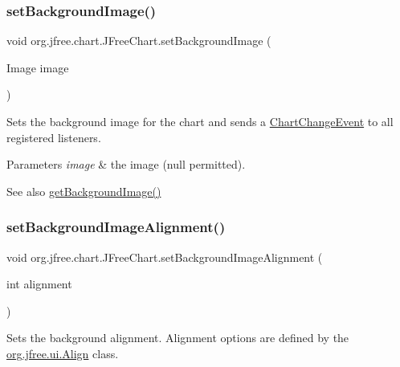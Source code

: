 \subsubsection{\texorpdfstring{set\+Background\+Image()}{setBackgroundImage()}}
{\footnotesize\ttfamily void org.\+jfree.\+chart.\+J\+Free\+Chart.\+set\+Background\+Image (\begin{DoxyParamCaption}\item[{Image}]{image }\end{DoxyParamCaption})}

Sets the background image for the chart and sends a \mbox{\hyperlink{}{Chart\+Change\+Event}} to all registered listeners.


\begin{DoxyParams}{Parameters}
{\em image} & the image ({\ttfamily null} permitted).\\
\hline
\end{DoxyParams}
\begin{DoxySeeAlso}{See also}
\mbox{\hyperlink{classorg_1_1jfree_1_1chart_1_1_j_free_chart_a54597d54f86fd436c244870472e317be}{get\+Background\+Image()}} 
\end{DoxySeeAlso}
\mbox{\label{classorg_1_1jfree_1_1chart_1_1_j_free_chart_a7be0530e282f757e47b6aa9a8ac63b05}} 
\subsubsection{\texorpdfstring{set\+Background\+Image\+Alignment()}{setBackgroundImageAlignment()}}
{\footnotesize\ttfamily void org.\+jfree.\+chart.\+J\+Free\+Chart.\+set\+Background\+Image\+Alignment (\begin{DoxyParamCaption}\item[{int}]{alignment }\end{DoxyParamCaption})}

Sets the background alignment. Alignment options are defined by the \mbox{\hyperlink{}{org.\+jfree.\+ui.\+Align}} class.


